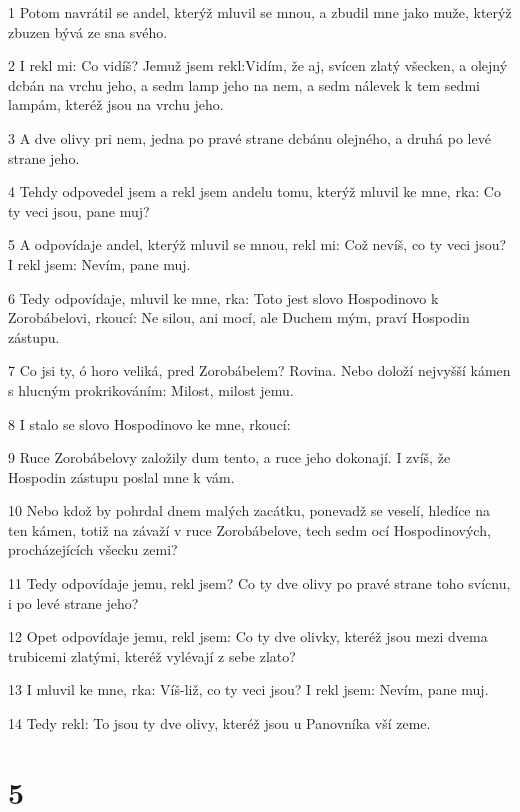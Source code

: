 \par 1 Potom navrátil se andel, kterýž mluvil se mnou, a zbudil mne jako muže, kterýž zbuzen bývá ze sna svého.
\par 2 I rekl mi: Co vidíš? Jemuž jsem rekl:Vidím, že aj, svícen zlatý všecken, a olejný dcbán na vrchu jeho, a sedm lamp jeho na nem, a sedm nálevek k tem sedmi lampám, kteréž jsou na vrchu jeho.
\par 3 A dve olivy pri nem, jedna po pravé strane dcbánu olejného, a druhá po levé strane jeho.
\par 4 Tehdy odpovedel jsem a rekl jsem andelu tomu, kterýž mluvil ke mne, rka: Co ty veci jsou, pane muj?
\par 5 A odpovídaje andel, kterýž mluvil se mnou, rekl mi: Což nevíš, co ty veci jsou? I rekl jsem: Nevím, pane muj.
\par 6 Tedy odpovídaje, mluvil ke mne, rka: Toto jest slovo Hospodinovo k Zorobábelovi, rkoucí: Ne silou, ani mocí, ale Duchem mým, praví Hospodin zástupu.
\par 7 Co jsi ty, ó horo veliká, pred Zorobábelem? Rovina. Nebo doloží nejvyšší kámen s hlucným prokrikováním: Milost, milost jemu.
\par 8 I stalo se slovo Hospodinovo ke mne, rkoucí:
\par 9 Ruce Zorobábelovy založily dum tento, a ruce jeho dokonají. I zvíš, že Hospodin zástupu poslal mne k vám.
\par 10 Nebo kdož by pohrdal dnem malých zacátku, ponevadž se veselí, hledíce na ten kámen, totiž na závaží v ruce Zorobábelove, tech sedm ocí Hospodinových, procházejících všecku zemi?
\par 11 Tedy odpovídaje jemu, rekl jsem? Co ty dve olivy po pravé strane toho svícnu, i po levé strane jeho?
\par 12 Opet odpovídaje jemu, rekl jsem: Co ty dve olivky, kteréž jsou mezi dvema trubicemi zlatými, kteréž vylévají z sebe zlato?
\par 13 I mluvil ke mne, rka: Víš-liž, co ty veci jsou? I rekl jsem: Nevím, pane muj.
\par 14 Tedy rekl: To jsou ty dve olivy, kteréž jsou u Panovníka vší zeme.

\chapter{5}

